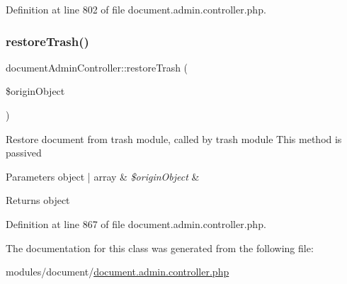Definition at line 802 of file document.\+admin.\+controller.\+php.

\hypertarget{classdocumentAdminController_a3750ffc8b40a8bbd46f5ac455e65cb37}{}\label{classdocumentAdminController_a3750ffc8b40a8bbd46f5ac455e65cb37} 
\subsubsection{\texorpdfstring{restore\+Trash()}{restoreTrash()}}
{\footnotesize\ttfamily document\+Admin\+Controller\+::restore\+Trash (\begin{DoxyParamCaption}\item[{}]{\$origin\+Object }\end{DoxyParamCaption})}

Restore document from trash module, called by trash module This method is passived 
\begin{DoxyParams}[1]{Parameters}
object | array & {\em \$origin\+Object} & \\
\hline
\end{DoxyParams}
\begin{DoxyReturn}{Returns}
object 
\end{DoxyReturn}


Definition at line 867 of file document.\+admin.\+controller.\+php.



The documentation for this class was generated from the following file\+:\begin{DoxyCompactItemize}
\item 
modules/document/\hyperlink{document_8admin_8controller_8php}{document.\+admin.\+controller.\+php}\end{DoxyCompactItemize}
